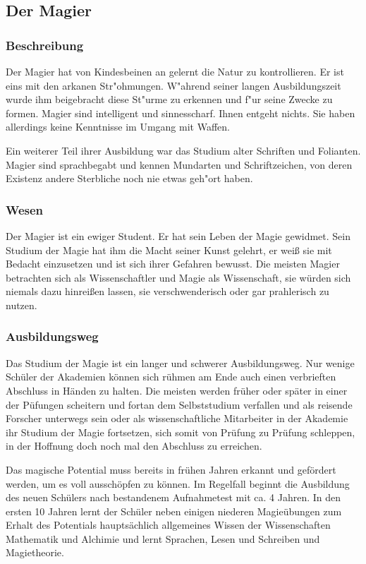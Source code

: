 \subsection{Der Magier}
\subsubsection{Beschreibung}
\par Der Magier hat von Kindesbeinen an gelernt
die Natur zu kontrollieren. Er ist eins mit den arkanen
Str"ohmungen. W"ahrend seiner langen
Ausbildungszeit wurde ihm beigebracht diese St"urme zu erkennen und
f"ur seine Zwecke zu formen. Magier sind intelligent
und sinnesscharf. Ihnen entgeht nichts. Sie haben allerdings keine
Kenntnisse im Umgang mit Waffen.
\par Ein weiterer Teil ihrer Ausbildung war das Studium
alter Schriften und Folianten.
Magier sind sprachbegabt und kennen Mundarten und
Schriftzeichen, von deren Existenz andere Sterbliche noch nie etwas
geh"ort haben.
\subsubsection{Wesen}
\par Der Magier ist ein ewiger Student. Er hat sein Leben der Magie
gewidmet. Sein Studium der Magie hat ihm die Macht seiner Kunst
gelehrt, er weiß sie mit Bedacht einzusetzen und ist sich ihrer
Gefahren bewusst. Die meisten Magier betrachten sich als
Wissenschaftler und Magie als Wissenschaft, sie würden sich niemals
dazu hinreißen lassen, sie verschwenderisch oder gar prahlerisch zu
nutzen.
\subsubsection{Ausbildungsweg}
\par Das Studium der Magie ist ein langer und schwerer
Ausbildungsweg. Nur wenige Schüler der Akademien können sich rühmen
am Ende auch einen verbrieften Abschluss in Händen zu halten. Die
meisten werden früher oder später in einer der Püfungen scheitern
und fortan dem Selbststudium verfallen und als reisende Forscher
unterwegs sein oder als wissenschaftliche Mitarbeiter in der
Akademie ihr Studium der Magie fortsetzen, sich somit von Prüfung zu
Prüfung schleppen, in der Hoffnung doch noch mal den Abschluss zu
erreichen.
\par Das magische Potential muss bereits in frühen Jahren erkannt
und gefördert werden, um es voll ausschöpfen zu können. Im Regelfall
beginnt die Ausbildung des neuen Schülers nach bestandenem
Aufnahmetest mit ca. 4 Jahren. In den ersten 10 Jahren lernt der
Schüler neben einigen niederen Magieübungen zum Erhalt des
Potentials hauptsächlich allgemeines Wissen der Wissenschaften
Mathematik und Alchimie und lernt Sprachen, Lesen und Schreiben und
Magietheorie.
